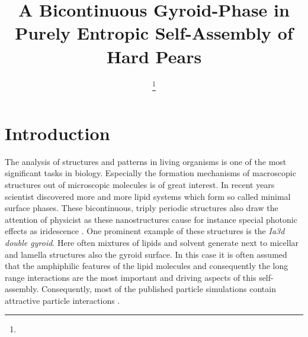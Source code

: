 \documentclass[epj,onecolumn]{webofc}
\begin{document}
%
\title{A Bicontinuous Gyroid-Phase in Purely Entropic Self-Assembly of Hard Pears}

\author{ \fnsep\thanks{} \and
         \and 
         \and
         \and
         
}


\abstract{%
}
%
\maketitle
%


\section{Introduction}
\label{sec:Intro}

The analysis of structures and patterns in living organisms is one of the most significant tasks in biology. Especially the formation mechanisms of macroscopic structures out of microscopic molecules is of great interest. In recent 
years scientist discovered more and more lipid systems which form so called minimal surface phases. These bicontinuous, triply periodic structures also draw the attention of physicist as these nanostructures cause for instance
special photonic effects as iridescence \cite{}. One prominent example of these structures is the \textit{Ia3d double gyroid}. Here often mixtures of lipids and solvent generate next to micellar and lamella structures also the gyroid 
surface. In this case it is often assumed that the amphiphilic features of the lipid molecules and consequently the long range interactions are the most important and driving aspects of this self-assembly. Consequently, most of the 
published particle simulations contain attractive particle interactions \cite{}.\\
\end{document}
